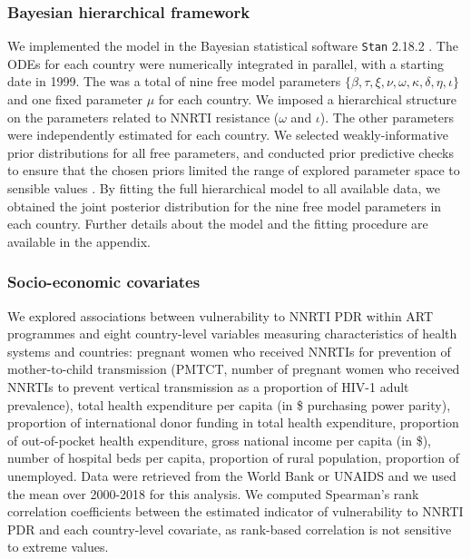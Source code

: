 \documentclass{article}
\begin{document}
\subsubsection{Bayesian hierarchical framework}

We implemented the model in the Bayesian statistical software \texttt{Stan} 2.18.2 \cite{carpenter2017stan}.
The ODEs for each country were numerically integrated in parallel, with a starting date in 1999. 
The was a total of nine free model parameters $\{\beta,\tau,\xi,\nu,\omega,\kappa,\delta,\eta,\iota\}$ and one fixed parameter $\mu$ for each country. 
We imposed a hierarchical structure on the parameters related to NNRTI resistance ($\omega$ and $\iota$). The other parameters were independently estimated for each country. We selected weakly-informative prior distributions for all free parameters, and conducted prior predictive checks to ensure that the chosen priors limited the range of explored parameter space to sensible values \cite{gabry2019visualization}. By fitting the full hierarchical model to all available data, we obtained the joint posterior distribution for the nine free model parameters in each country. Further details about the model and the fitting procedure are available in the appendix.

\subsubsection{Socio-economic covariates}

We explored associations between vulnerability to NNRTI PDR within ART programmes and eight country-level variables measuring characteristics of health systems and countries: pregnant women who received NNRTIs for prevention of  mother-to-child transmission (PMTCT, number of pregnant women who received NNRTIs to prevent vertical transmission  as a proportion of HIV-1 adult prevalence), total health expenditure per capita (in \$ purchasing power parity), proportion of international donor funding in total health expenditure, proportion of out-of-pocket health expenditure, gross national income per capita (in \$), number of hospital beds per capita, proportion of rural population, proportion of unemployed. Data were retrieved from the World Bank or UNAIDS \cite{worldbank,unaidsreport2019} and we used the mean over 2000-2018 for this analysis. We computed Spearman's rank correlation coefficients between the estimated indicator of vulnerability to NNRTI PDR and each country-level covariate, as rank-based correlation is not sensitive to extreme values.
\end{document}
